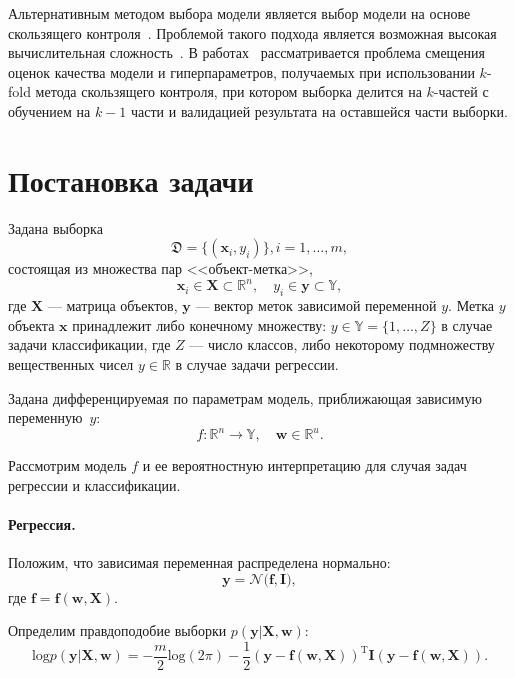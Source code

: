 \documentclass[12pt]{article}
\begin{document}
Альтернативным методом выбора модели является выбор модели на основе скользящего контроля~\cite{cv_ms, tokmakova}. Проблемой такого подхода является возможная высокая вычислительная сложность~\cite{expensive,expensive2}. В работах~\cite{bias,bias2} рассматривается проблема смещения оценок качества модели и гиперпараметров, получаемых при использовании $k$-fold метода скользящего контроля, при котором выборка делится на $k$-частей с обучением на $k-1$ части и валидацией результата на оставшейся части выборки. 




\section{Постановка задачи}
Задана выборка  \begin{equation}\label{eq:dataset}\mathfrak{D} = \{(\mathbf{x}_i,y_i)\}, i = 1,\dots,m,\end{equation} состоящая из множества пар <<объект-метка>>, $$\mathbf{x}_i \in \mathbf{X} \subset \mathbb{R}^n, \quad {y}_i \in \mathbf{y} \subset \mathbb{Y},$$ где $\mathbf{X}$ --- матрица объектов,  $\mathbf{y}$ --- вектор меток зависимой переменной $y$. Метка ${y}$  объекта $\mathbf{x}$ принадлежит либо конечному множеству: ${y} \in \mathbb{Y} = \{1, \dots, Z\}$ в случае задачи классификации, где $Z$ --- число классов, либо некоторому подмножеству вещественных чисел ${y} \in  \mathbb{R}$ в случае задачи регрессии.

Задана дифференцируемая по параметрам модель, приближающая зависимую переменную~$y$:
\[
	f:\mathbb{R}^n \to \mathbb{Y}, \quad \mathbf{w} \in \mathbb{R}^u.
\]

Рассмотрим модель $f$ и ее вероятностную интерпретацию для случая задач регрессии и классификации. 

\paragraph{Регрессия. }
Положим, что зависимая переменная распределена нормально:
\begin{equation}
\label{eq:reg}
\mathbf{y} = \mathcal{N}\bigl(\mathbf{f}, \mathbf{I}\bigr),
\end{equation}
где $\mathbf{f} = \mathbf{f}(\mathbf{w}, \mathbf{X})$.

Определим правдоподобие выборки $p(\mathbf{y}|\mathbf{X}, \mathbf{w})$:
\[
	\text{log}p(\mathbf{y}|\mathbf{X}, \mathbf{w}) =-\frac{m}{2}\text{log}(2\pi)   -\frac{1}{2}(\mathbf{y} - \mathbf{f}(\mathbf{w}, \mathbf{X}))^\text{T}\mathbf{I}(\mathbf{y} - \mathbf{f}(\mathbf{w}, \mathbf{X})).
\] 
\end{document}
